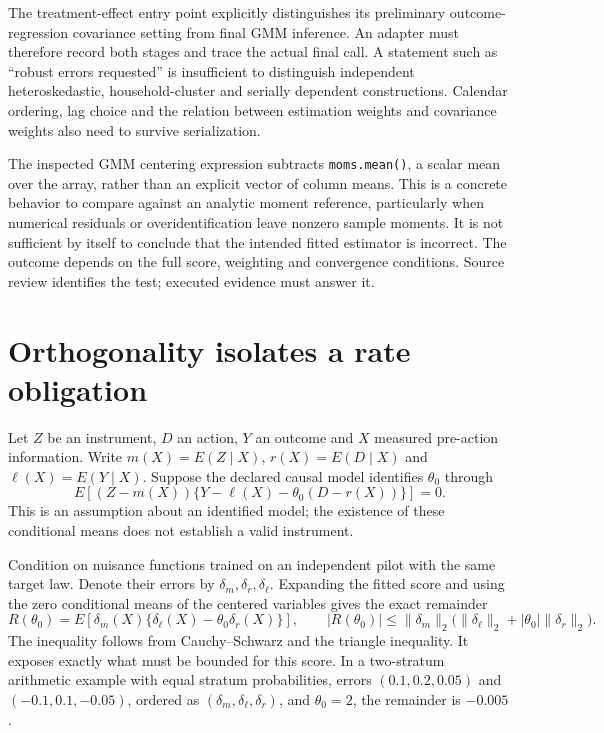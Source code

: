 The treatment-effect entry point explicitly distinguishes its preliminary
outcome-regression covariance setting from final GMM inference. An adapter must
therefore record both stages and trace the actual final call. A statement such
as ``robust errors requested'' is insufficient to distinguish independent
heteroskedastic, household-cluster and serially dependent constructions.
Calendar ordering, lag choice and the relation between estimation weights and
covariance weights also need to survive serialization. \cite{v13_sw_statsmodels,v131_sw_statsmodels}

The inspected GMM centering expression subtracts \texttt{moms.mean()}, a scalar
mean over the array, rather than an explicit vector of column means. This is
a concrete behavior to compare against an analytic moment reference, particularly
when numerical residuals or overidentification leave nonzero sample moments.
It is not sufficient by itself to conclude that the intended fitted estimator
is incorrect. The outcome depends on the full score, weighting and convergence
conditions. Source review identifies the test; executed evidence must answer it.
\cite{v131_sw_statsmodels}

\section{Orthogonality isolates a rate obligation}

Let $Z$ be an instrument, $D$ an action, $Y$ an outcome and $X$ measured
pre-action information. Write $m(X)=E(Z\mid X)$, $r(X)=E(D\mid X)$ and
$\ell(X)=E(Y\mid X)$. Suppose the declared causal model identifies $\theta_0$
through
\[
 E[(Z-m(X))\{Y-\ell(X)-\theta_0(D-r(X))\}]=0.
\]
This is an assumption about an identified model; the existence of these
conditional means does not establish a valid instrument.

Condition on nuisance functions trained on an independent pilot with the same
target law. Denote their errors by $\delta_m,\delta_r,\delta_\ell$. Expanding
the fitted score and using the zero conditional means of the centered variables
gives the exact remainder
\[
 R(\theta_0)
 =E[\delta_m(X)\{\delta_\ell(X)-\theta_0\delta_r(X)\}],
 \qquad
 |R(\theta_0)|\leq
 \|\delta_m\|_2\bigl(\|\delta_\ell\|_2+|\theta_0|\|\delta_r\|_2\bigr).
\]
The inequality follows from Cauchy--Schwarz and the triangle inequality. It
exposes exactly what must be bounded for this score. In a two-stratum arithmetic
example with equal stratum probabilities, errors $(0.1,0.2,0.05)$ and
$(-0.1,0.1,-0.05)$, ordered as $(\delta_m,\delta_\ell,\delta_r)$, and
$\theta_0=2$, the remainder is $-0.005$. \cite{v131_project_semantics}

